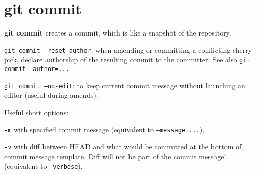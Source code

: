 %

\section{git commit}
\textbf{git commit} creates a commit, which is like a snapshot of the repository.

\texttt{git commit --reset-author}: when amending or committing a conflicting cherry-pick, declare authorship of the resulting commit to the committer.
See also \texttt{git commit --author=...}

\texttt{git commit --no-edit}: to keep current commit message without launching an editor (useful during amends).

Useful short options:
\begin{compactenum}
\item [\texttt{-m}] with specified commit message (equivalent to \texttt{--message=...}),
\item [\texttt{-v}] with diff between HEAD and what would be committed at the bottom of commit message template.
Diff will not be part of the commit message!.
(equivalent to \texttt{--verbose}),
\end{compactenum}

%